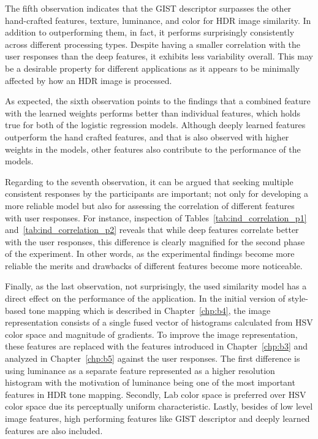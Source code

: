 The fifth observation indicates that the GIST descriptor surpasses the other hand-crafted features, texture, luminance, and color for HDR image similarity. In addition to outperforming them, in fact, it performs surprisingly consistently across different processing types. Despite having a smaller correlation with the user responses than the deep features, it exhibits less variability overall. This may be a desirable property for different applications as it appears to be minimally affected by how an HDR image is processed.

As expected, the sixth observation points to the findings that a combined feature with the learned weights performs better than individual features, which holds true for both of the logistic regression models. Although deeply learned features outperform the hand crafted features, and that is also observed with higher weights in the models, other features also contribute to the performance of the models. 

Regarding to the seventh observation, it can be argued that seeking multiple consistent responses by the participants are important; not only for developing a more reliable model but also for assessing the correlation of different features with user responses. For instance, inspection of Tables~\ref{tab:ind_correlation_p1} and~\ref{tab:ind_correlation_p2} reveals that while deep features correlate better with the user responses, this difference is clearly magnified for the second phase of the experiment. In other words, as the experimental findings become more reliable the merits and drawbacks of different features become more noticeable.

Finally, as the last observation, not surprisingly, the used similarity model has a direct effect on the performance of the application. In the initial version of style-based tone mapping which is described in Chapter~\ref{chp:b4}, the image representation consists of a single fused vector of histograms calculated from HSV color space and magnitude of gradients. To improve the image representation, these features are replaced with the features introduced in Chapter~\ref{chp:b3} and analyzed in Chapter~\ref{chp:b5} against the user responses. The first difference is using luminance as a separate feature represented as a higher resolution histogram with the motivation of luminance being one of the most important features in HDR tone mapping. Secondly, Lab color space is preferred over HSV color space due its perceptually uniform characteristic. Lastly, besides of low level image features, high performing features like GIST descriptor and deeply learned features are also included.

